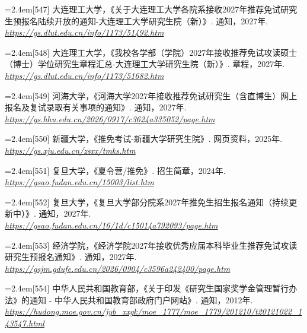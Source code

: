 {\par\noindent\hangindent=2.4em\label{src:S0174}{\color{cAccent}[547]} 大连理工大学，《关于大连理工大学各院系接收2027年推荐免试研究生预报名陆续开放的通知-大连理工大学研究生院（新）》. 通知，2027年. \textit{\url{https://gs.dlut.edu.cn/info/1173/51492.htm}}\par
\par\noindent\hangindent=2.4em\label{src:S0175}{\color{cAccent}[548]} 大连理工大学，《我校各学部（学院）2027年接收推荐免试攻读硕士（博士）学位研究生章程汇总-大连理工大学研究生院（新）》. 章程，2027年. \textit{\url{https://gs.dlut.edu.cn/info/1173/51682.htm}}\par
\par\noindent\hangindent=2.4em\label{src:S0177}{\color{cAccent}[549]} 河海大学，《河海大学2027年接收推荐免试研究生（含直博生）网上报名及复试录取有关事项的通知》. 通知，2027年. \textit{\url{https://gs.hhu.edu.cn/2026/0917/c3624a335052/page.htm}}\par
\par\noindent\hangindent=2.4em\label{src:S0187}{\color{cAccent}[550]} 新疆大学，《推免考试-新疆大学研究生院》. 网页资料，2025年. \textit{\url{https://gs.xju.edu.cn/zsxx/tmks.htm}}\par
\par\noindent\hangindent=2.4em\label{src:S0191}{\color{cAccent}[551]} 复旦大学，《夏令营/推免》. 招生简章，2024年. \textit{\url{https://gsao.fudan.edu.cn/15003/list.htm}}\par
\par\noindent\hangindent=2.4em\label{src:S0192}{\color{cAccent}[552]} 复旦大学，《复旦大学部分院系2027年推免生招生报名通知（持续更新中）》. 通知，2027年. \textit{\url{https://gsao.fudan.edu.cn/16/1d/c15014a792093/page.htm}}\par
\par\noindent\hangindent=2.4em\label{src:S0196}{\color{cAccent}[553]} 经济学院，《经济学院2027年接收优秀应届本科毕业生推荐免试攻读研究生预报名通知》. 通知，2027年. \textit{\url{https://gsjm.gdufe.edu.cn/2026/0904/c3596a242400/page.htm}}\par
\par\noindent\hangindent=2.4em\label{src:S0202}{\color{cAccent}[554]} 中华人民共和国教育部，《关于印发《研究生国家奖学金管理暂行办法》的通知 - 中华人民共和国教育部政府门户网站》. 通知，2012年. \textit{\url{https://hudong.moe.gov.cn/jyb_xxgk/moe_1777/moe_1779/201210/t20121022_143547.html}}\par
}
